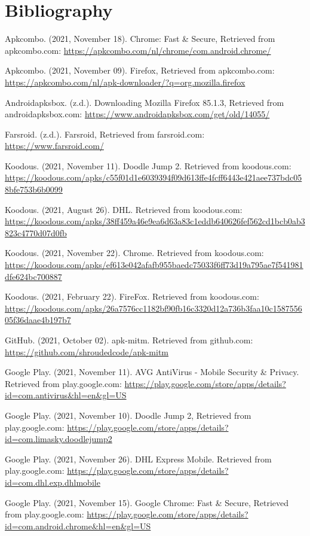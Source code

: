 \section*{Bibliography}
Apkcombo. (2021, November 18).
	Chrome: Fast \& Secure, Retrieved from apkcombo.com:
	\url{https://apkcombo.com/nl/chrome/com.android.chrome/}

Apkcombo. (2021, November 09).
	Firefox, Retrieved from apkcombo.com:
	\url{https://apkcombo.com/nl/apk-downloader/?q=org.mozilla.firefox}

Androidapksbox. (z.d.).
	Downloading Mozilla Firefox 85.1.3, Retrieved from androidapksbox.com:
    \url{https://www.androidapksbox.com/get/old/14055/} 

Farsroid. (z.d.).
	Farsroid, Retrieved from farsroid.com:
	\url{https://www.farsroid.com/} 

Koodous. (2021, November 11).
    Doodle Jump 2. Retrieved from koodous.com:
    \url{https://koodous.com/apks/c55f01d1e6039394f09d613ffe4fcff6443e421aee737bdc058bfe753b6b0099}

Koodous. (2021, August 26).
    DHL. Retrieved from koodous.com:
    \url{https://koodous.com/apks/38ff459a46e9ea6d63a83c1eddb640626fef562cd1bcb0ab3823c4770d07d0fb}

Koodous. (2021, November 22).
    Chrome. Retrieved from koodous.com:
    \url{https://koodous.com/apks/ef613e042afafb955baedc75033f6ff73d19a795ae7f541981dfe624bc700887}

Koodous. (2021, February 22).
    FireFox. Retrieved from koodous.com:
    \url{https://koodous.com/apks/26a7576cc1182bf90fb16c3320d12a736b3faa10c158755605f36daae4b197b7} 

GitHub. (2021, October 02).
	apk-mitm. Retrieved from github.com:
	\url{https://github.com/shroudedcode/apk-mitm}

Google Play. (2021, November 11).
	AVG AntiVirus - Mobile Security \& Privacy. Retrieved from play.google.com:
	\url{https://play.google.com/store/apps/details?id=com.antivirus\&hl=en\&gl=US}

Google Play. (2021, November 10).
	Doodle Jump 2, Retrieved from play.google.com:
	\url{https://play.google.com/store/apps/details?id=com.limasky.doodlejump2}

Google Play. (2021, November 26).
	DHL Express Mobile. Retrieved from play.google.com:
	\url{https://play.google.com/store/apps/details?id=com.dhl.exp.dhlmobile}

Google Play. (2021, November 15).
	Google Chrome: Fast \& Secure, Retrieved from play.google.com:
	\url{https://play.google.com/store/apps/details?id=com.android.chrome\&hl=en\&gl=US}

